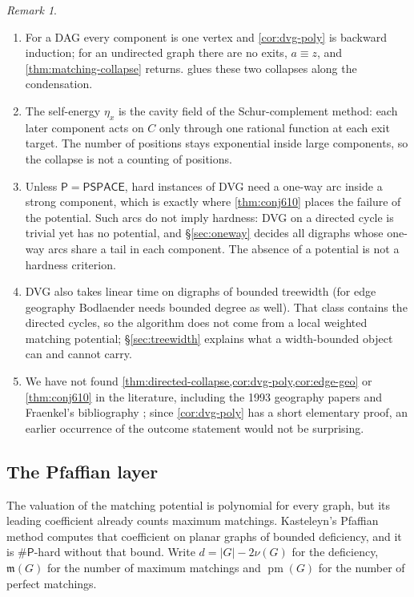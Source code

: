 \documentclass[11pt]{amsart}
\theoremstyle{plain}
\theoremstyle{definition}
\theoremstyle{remark}
\newtheorem*{remark*}{Remark}
\numberwithin{equation}{section}
\newcommand{\mm}{\mathfrak{m}}            %
\newcommand{\cls}[1]{\mathsf{#1}}
\newcommand{\PSPACE}{\cls{PSPACE}}
\newcommand{\Pclass}{\cls{P}}
\newcommand{\sharpP}{\#\cls{P}}
\begin{document}
\begin{remark*}
\begin{enumerate}[label=(\arabic*)]
\item For a DAG every component is one vertex and \cref{cor:dvg-poly} is backward induction; for an undirected graph there are no exits, $a\equiv z$, and \cref{thm:matching-collapse} returns.  glues these two collapses along the condensation.
\item The self-energy $\eta_x$ is the cavity field of the Schur-complement method: each later component acts on $C$ only through one rational function at each exit target. The number of positions stays exponential inside large components, so the collapse is not a counting of positions.
\item Unless $\Pclass=\PSPACE$, hard instances of DVG need a one-way arc inside a strong component, which is exactly where \cref{thm:conj610} places the failure of the potential. Such arcs do not imply hardness: DVG on a directed cycle is trivial yet has no potential, and \S\ref{sec:oneway} decides all digraphs whose one-way arcs share a tail in each component. The absence of a potential is not a hardness criterion.
\item DVG also takes linear time on digraphs of bounded treewidth \cite{Bodlaender} (for edge geography Bodlaender needs bounded degree as well). That class contains the directed cycles, so the algorithm does not come from a local weighted matching potential; \S\ref{sec:treewidth} explains what a width-bounded object can and cannot carry.
\item We have not found \cref{thm:directed-collapse,cor:dvg-poly,cor:edge-geo} or \cref{thm:conj610} in the literature, including the 1993 geography papers \cite{Bodlaender,FraenkelSimonson,FSU} and Fraenkel's bibliography \cite{FraenkelBib}; since \cref{cor:dvg-poly} has a short elementary proof, an earlier occurrence of the outcome statement would not be surprising.
\end{enumerate}
\end{remark*}

\subsection{The Pfaffian layer}\label{ssec:pfaffian}
The valuation of the matching potential is polynomial for every graph, but its leading coefficient already counts maximum matchings. Kasteleyn's Pfaffian method computes that coefficient on planar graphs of bounded deficiency, and it is $\sharpP$-hard without that bound. Write $d=|G|-2\nu(G)$ for the deficiency, $\mm(G)$ for the number of maximum matchings and $\operatorname{pm}(G)$ for the number of perfect matchings.
\end{document}
